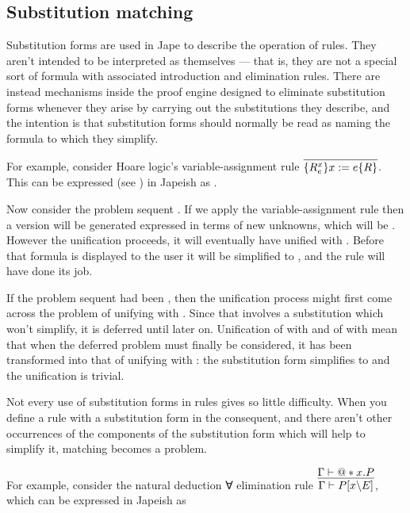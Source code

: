 \subsection{Substitution matching}

Substitution forms are used in Jape to describe the operation of rules. They aren't intended to be interpreted as themselves --- that is, they are not a special sort of formula with associated introduction and elimination rules. There are instead mechanisms inside the proof engine designed to eliminate substitution forms whenever they arise by carrying out the substitutions they describe, and the intention is that substitution forms should normally be read as naming the formula to which they simplify. 

For example, consider Hoare logic's variable-assignment rule $\infer{\{ R^{x}_{e} \} x:=e \{R\}}{}$. This can be expressed (see ) in Japeish as .

Now consider the problem sequent . If we apply the variable-assignment rule then a version will be generated expressed in terms of new unknowns, which will be . However the unification proceeds, it will eventually have unified  with . Before that formula is displayed to the user it will be simplified to , and the rule will have done its job.

If the problem sequent had been , then the unification process might first come across the problem of unifying  with . Since that involves a substitution which won't simplify, it is deferred until later on. Unification of  with  and of  with  mean that when the deferred problem must finally be considered, it has been transformed into that of unifying  with : the substitution form simplifies to  and the unification is trivial.

Not every use of substitution forms in rules gives so little difficulty. When you define a rule with a substitution form in the consequent, and there aren't other occurrences of the components of the substitution form which will help to simplify it, matching becomes a problem. 

For example, consider the natural deduction ∀ elimination rule $\infer{\Gamma  |- P[x\backslash E]}{\Gamma  |- @*x.P}$, which can be expressed in Japeish as

